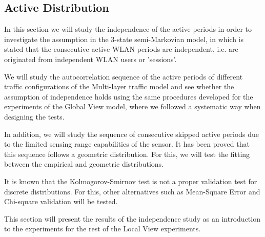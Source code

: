 \subsection{Active Distribution} \label{subsec:localview_active}
In this section we will study the independence of the active periods in order to investigate the assumption in the 3-state semi-Markovian model, in which is stated that the consecutive active \acs{WLAN} periods are independent, i.e. are originated from independent \acs{WLAN} users or 'sessions'. 

We will study the autocorrelation sequence of the active periods of different traffic configurations of the Multi-layer traffic model and see whether the assumption of independence holds using the same procedures developed for the experiments of the Global View model, where we followed a systematic way when designing the tests.

In addition, we will study the sequence of consecutive skipped active periods due to the limited sensing range capabilities of the sensor. It has been proved that this sequence follows a geometric distribution. For this, we will test the fitting between the empirical and geometric distributions.

It is known that the Kolmogorov-Smirnov test is not a proper validation test for discrete distributions. For this, other alternatives such as Mean-Square Error and Chi-square validation will be tested.

This section will present the results of the independence study as an introduction to the experiments for the rest of the Local View experiments.




